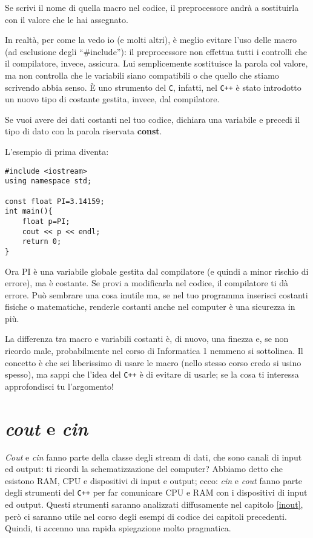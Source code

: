 	Se scrivi il nome di quella macro nel codice, il preprocessore andrà a sostituirla con il valore che le hai assegnato. 
	
	In realtà, per come la vedo io (e molti altri), è meglio evitare l'uso delle macro (ad esclusione degli ``\#include''): il preprocessore non effettua tutti i controlli che il compilatore, invece, assicura. Lui semplicemente sostituisce la parola col valore, ma non controlla che le variabili siano compatibili o che quello che stiamo scrivendo abbia senso. \`E uno strumento del \verb|C|, infatti, nel \verb|C++| è stato introdotto un nuovo tipo di costante gestita, invece, dal compilatore. 
	
	Se vuoi avere dei dati costanti nel tuo codice, dichiara una variabile e precedi il tipo di dato con la parola riservata \textbf{const}.
	
	L'esempio di prima diventa:
	\begin{lstlisting}
#include <iostream>
using namespace std;
	
const float PI=3.14159;
int main(){
	float p=PI;
	cout << p << endl;
	return 0;
}
	\end{lstlisting}
	Ora PI è una variabile globale gestita dal compilatore (e quindi a minor rischio di errore), ma è costante. Se provi a modificarla nel codice, il compilatore ti dà errore. Può sembrare una cosa inutile ma, se nel tuo programma inserisci costanti fisiche o matematiche, renderle costanti anche nel computer è una sicurezza in più. 
	
	La differenza tra macro e variabili costanti è, di nuovo, una finezza e, se non ricordo male, probabilmente nel corso di Informatica 1 nemmeno si sottolinea. Il concetto è che sei liberissimo di usare le macro (nello stesso corso credo si usino spesso), ma sappi che l'idea del \verb|C++| è di evitare di usarle; se la cosa ti interessa approfondisci tu l'argomento!
	
	\section{\emph{cout} e \emph{cin}}\label{coutcin}
	\emph{Cout} e \emph{cin} fanno parte della classe degli stream di dati, che sono canali di input ed output: ti ricordi la schematizzazione del computer? Abbiamo detto che esistono RAM, CPU e dispositivi di input e output; ecco: \emph{cin} e \emph{cout} fanno parte degli strumenti del \verb|C++| per far comunicare CPU e RAM con i dispositivi di input ed output. Questi strumenti saranno analizzati diffusamente nel capitolo \ref{inout}, però ci saranno utile nel corso degli esempi di codice dei capitoli precedenti. Quindi, ti accenno una rapida spiegazione molto pragmatica.
	

